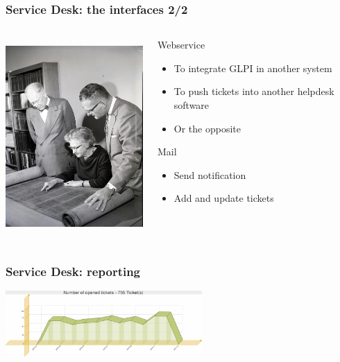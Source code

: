 \documentclass{beamer}
\begin{document}
\begin{frame}

    \frametitle{Service Desk: the interfaces 2/2}


 \begin{columns}
 \begin{column}{0.45\textwidth}
         \includegraphics[height=7.5cm]{./pics/servicedesk3.jpg}
 \end{column}
 \begin{column}{0.45\textwidth}
     \begin{block}{Webservice}
        \begin{itemize}
            \item To integrate GLPI in another system
            \item To push tickets into another helpdesk software
            \item Or the opposite
        \end{itemize}
    \end{block}
\pause
    \begin{block}{Mail}
       \begin{itemize}
            \item Send notification
            \item Add and update tickets
       \end{itemize}
    \end{block}

 
 \end{column}
\end{columns}

\end{frame}

\begin{frame}

\frametitle{Service Desk: reporting}
\includegraphics[height=2.5cm]{./pics/report1.png}
\end{frame}
\end{document}
